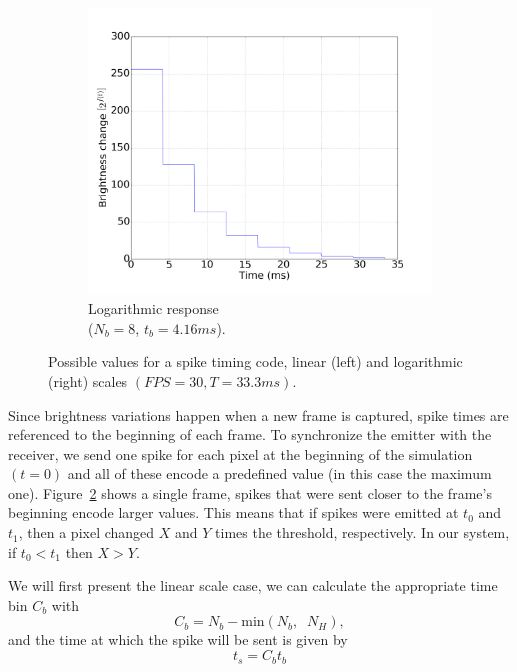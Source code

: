 \documentclass[conference]{IEEEtran}
\begin{document}
\begin{figure}[hbt]
\begin{center}
\begin{subfigure}[b]{0.25\textwidth}
      \includegraphics[width=\textwidth]{logarithmic_response_graph}
      \caption{Logarithmic response\\($N_{b}=8$, $t_{b}=4.16ms$).}
      \label{fig:logaritmic_time_resp}
    \end{subfigure}
    
    \caption{Possible values for a spike timing code, linear (left) and logarithmic (right) scales $\left(FPS = 30, T=33.3 ms\right)$.}
    \label{fig:linear_log_response}
  \end{center}
\end{figure}

Since brightness variations happen when a new frame is captured, spike times are referenced to the beginning of each frame. To synchronize the emitter with the receiver, we send one spike for each pixel at the beginning of the simulation $(t=0)$ and all of these encode a predefined value (in this case the maximum one). Figure~\ref{fig:linear_log_response} shows a single frame, spikes that were sent closer to the frame's beginning encode larger values. This means that if spikes were emitted at $t_{0}$ and $t_{1}$,  then a pixel changed $X$ and  $Y$ times the threshold, respectively. In our system, if $t_{0} < t_{1}$ then $X > Y$.

We will first present the linear scale case, we can calculate the appropriate time bin $C_{b}$ with
\begin{equation}
\label{eq:linear_bin_calc}
C_{b} = N_{b} - \mathrm{min}\left( N_{b}, \;\; N_{H} \right),
\end{equation}
and the time at which the spike will be sent is given by
\begin{equation}
t_{s} = C_{b}t_{b}
\end{equation}
\end{document}
